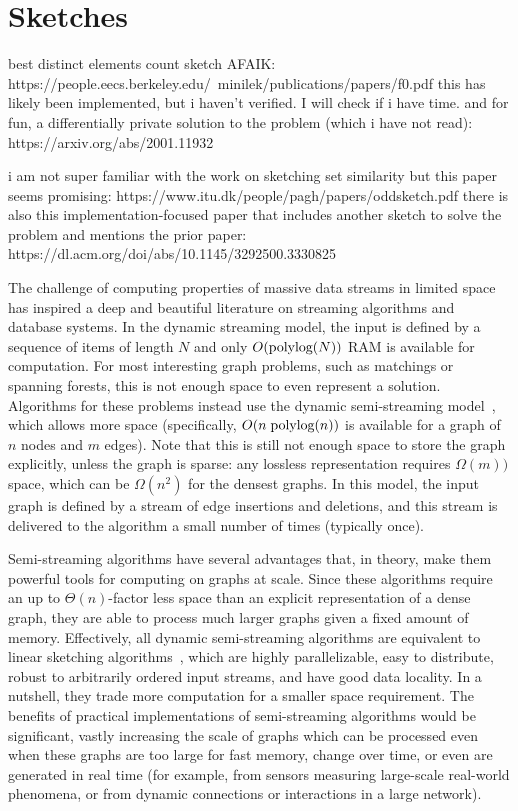 \section{Sketches}
best distinct elements count sketch AFAIK:
https://people.eecs.berkeley.edu/~minilek/publications/papers/f0.pdf
this has likely been implemented, but i haven't verified. I will check if i have time.
and for fun, a differentially private solution to the problem (which i have not read):
https://arxiv.org/abs/2001.11932


i am not super familiar with the work on sketching set similarity but this paper seems promising:
https://www.itu.dk/people/pagh/papers/oddsketch.pdf
there is also this implementation-focused paper that includes another sketch to solve the problem and mentions the prior paper:
https://dl.acm.org/doi/abs/10.1145/3292500.3330825



The challenge of computing properties of massive data streams in limited space has inspired a deep and beautiful literature on streaming algorithms and database systems. In the dynamic streaming model, the input is defined by a sequence of items of length $N$ and only $O(\textrm{polylog}{(N)})$ {RAM} is available for computation. For most interesting graph problems, such as matchings or spanning forests, this is not enough space to even represent a solution. Algorithms for these problems instead use the dynamic semi-streaming model~\cite{insertonlysemistreaming}, which allows more space (specifically, $O(n \; \textrm{polylog}{(n)})$  is available for a graph of $n$ nodes and $m$ edges). Note that this is still not enough space to store the graph explicitly, unless the graph is sparse: any lossless representation requires $\Omega(m))$ space, which can be $\Omega(n^2)$ for the densest graphs. In this model, the input graph is defined by a stream of edge insertions and deletions, and this stream is delivered to the algorithm a small number of times (typically once).

Semi-streaming algorithms have several advantages that, in theory, make them powerful tools for computing on graphs at scale.  Since these algorithms require an up to $\Theta(n)$-factor less space than an explicit representation of a dense graph, they are able to process much larger graphs given a fixed amount of memory. Effectively, all dynamic semi-streaming algorithms are equivalent to linear sketching algorithms~\cite{li2014sketchuniversal}, which are highly parallelizable, easy to distribute, robust to arbitrarily ordered input streams, and have good data locality. In a nutshell, they trade more computation for a smaller space requirement. %
The benefits of practical implementations of semi-streaming algorithms would be significant, vastly increasing the scale of graphs which can be processed even when these graphs are too large for fast memory, change over time, or even are generated in real time (for example, from sensors measuring large-scale real-world phenomena, or from dynamic connections or interactions in a large network).

